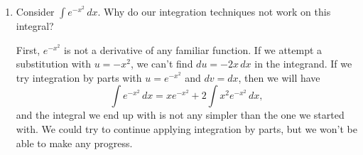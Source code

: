 \documentclass[main]{subfiles}
\begin{document}
\begin{enumerate}
\begin{enumerate}
    \item
    \begin{problem}[\vfill]
        $\displaystyle \int \arcsin x \, dx$
    \end{problem}

    \begin{solution}
        Use integration by parts with $u=\arcsin x$ and $dv = dx$.

        We have 
        \begin{align*}
            u = \arcsin x \qquad & dv = dx \\
            du = \frac{1}{\sqrt{1-x^2}}\, dx \qquad & v = x
        \end{align*}
        giving us
        \begin{align*}
            \int \arcsin x \, dx &= x\arcsin x - 
            \int \frac{x}{\sqrt{1-x^2}}\,dx.
        \end{align*}
        For the integral on the right, we can do substitution
        with $w=1-x^2$, $dw = -2x\,dx$.
        \begin{align*}
            \int \arcsin x \, dx &= x\arcsin x - 
            \int \frac{x}{\sqrt{1-x^2}}\,dx \\
            &= x\arcsin x  
            +\frac{1}{2}\int \frac{1}{\sqrt{w}}\,dw \\
            &= x\arcsin x  
            +\frac{1}{2}\int w^{-1/2}\,dw \\
            &= x\arcsin x  
            +w^{1/2} + C  \\
            &= x\arcsin x  
            + (1-x^2)^{1/2}\ + C.
        \end{align*}
    \end{solution}
\end{enumerate}




\item 
\begin{problem}[\vfill]
Consider $\int e^{-x^2}\, dx$. Why do our integration techniques not work on this integral?
\end{problem}

\begin{solution}
    First, $e^{-x^2}$ is not a derivative of any familiar function.
    If we attempt a substitution with $u=-x^2$, we can't find $du = -2x\,dx$ in
    the integrand. If we try integration by parts with $u=e^{-x^2}$ and $dv = dx$,
    then we will have
    \[\int e^{-x^2}\, dx = xe^{-x^2} +2 \int x^2e^{-x^2}\, dx,\]
    and the integral we end up with is not any simpler than the one we started 
    with. We could try to continue applying integration by parts, but
    we won't be able to make any progress.
\end{solution}


\end{enumerate}
\end{document}
